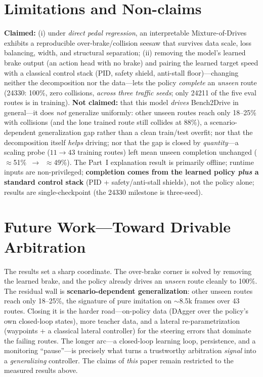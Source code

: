 \documentclass[10pt]{article}
\begin{document}
\section{Limitations and Non-claims}
\textbf{Claimed:} (i) under \emph{direct pedal regression}, an interpretable Mixture-of-Drives exhibits
a reproducible over-brake/collision seesaw that survives data scale, loss balancing, width, and
structural separation; (ii) removing the model's learned brake output (an action head with no brake)
and pairing the learned target speed with a classical control stack (PID, safety shield, anti-stall
floor)---changing neither the decomposition nor the data---lets the policy \emph{complete} an
\emph{unseen} route (24330: 100\%, zero collisions, \emph{across three traffic seeds}; only 24211 of
the five eval routes is in training).
\textbf{Not claimed:} that this model \emph{drives} Bench2Drive in general---it does \emph{not}
generalize uniformly: other unseen routes reach only 18--25\% with collisions (and the lone trained
route still collides at 88\%), a scenario-dependent generalization gap rather than a clean train/test
overfit; nor that the decomposition itself \emph{helps} driving; nor that the gap is closed by
\emph{quantity}---a scaling probe ($11\rightarrow43$ training routes) left mean unseen completion
unchanged ($\approx$51\%~$\rightarrow$~$\approx$49\%). The Part~I explanation result is primarily
offline; runtime inputs are non-privileged; \textbf{completion comes from the learned policy
\emph{plus} a standard control stack} (PID + safety/anti-stall shields), not the policy alone; results
are single-checkpoint (the 24330 milestone is three-seed).

\section{Future Work---Toward Drivable Arbitration}
The results set a sharp coordinate. The over-brake corner is solved by removing the learned brake, and
the policy already drives an \emph{unseen} route cleanly to 100\%. The residual wall is
\textbf{scenario-dependent generalization}: other unseen routes reach only 18--25\%, the signature of
pure imitation on $\sim$8.5k frames over 43 routes. Closing it is the harder road---on-policy data
(DAgger over the policy's own closed-loop states), more teacher data, and a lateral re-parametrization
(waypoints + a classical lateral controller) for the steering errors that dominate the failing routes. The longer
arc---a closed-loop learning loop, persistence, and a monitoring ``pause''---is precisely what turns a
trustworthy arbitration \emph{signal} into a \emph{generalizing} controller. The claims of \emph{this}
paper remain restricted to the measured results above.
\end{document}
